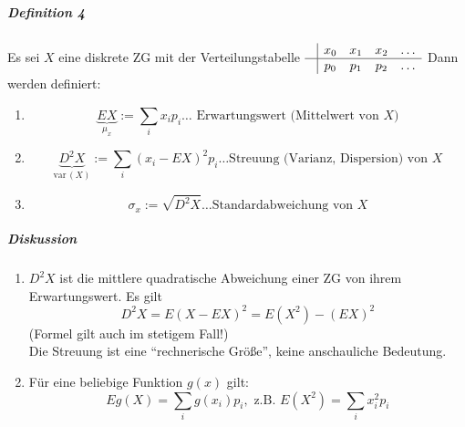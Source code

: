 \documentclass[a4paper]{scrartcl}
\begin{document}
\subparagraph{Definition 4} Es sei $X$ eine diskrete ZG mit der Verteilungstabelle
$\begin{array}{c|cccc}
& x_0 & x_1 & x_2 & \dots \\ \hline
& p_0 & p_1 & p_2 & \dots \\
\end{array}$ Dann werden definiert:
\begin{enumerate}
\item \[ \underbrace{EX}_{\mu_x} := \sum\limits_i x_i p_i \dots \text{ Erwartungswert (Mittelwert von } X )\]
\item \[ \underbrace{D^2 X}_{\text{var} \, (X)} := \sum\limits_i (x_i - EX)^2 p_i \dots \text{Streuung (Varianz, Dispersion) von } X\]
\item \[ \sigma_x := \sqrt{D^2 X} \dots \text{Standardabweichung von } X \]
\end{enumerate}

\subparagraph{Diskussion}
\begin{enumerate}
\item $D^2 X$ ist die mittlere quadratische Abweichung einer ZG von ihrem Erwartungswert. Es gilt
\[ D^2 X = E (X -EX)^2 = E(X^2) - (EX)^2\] (Formel gilt auch im stetigem Fall!)\\
Die Streuung ist eine "`rechnerische Größe"', keine anschauliche Bedeutung.
\item Für eine beliebige Funktion $g(x)$ gilt:
\[ Eg(X) = \sum\limits_i g(x_i) p_i, \text{ z.B. } E(X^2) = \sum\limits_i x_i^2 p_i\]
\end{enumerate}
\end{document}
